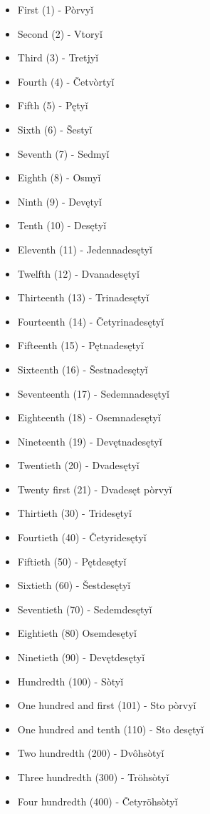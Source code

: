 \begin{itemize}
	\item First (1) - Pòrvyǐ
	\item Second (2) - Vtoryǐ
	\item Third (3) - Tretjyǐ
	\item Fourth (4) - Četvòrtyǐ
	\item Fifth (5) - Pętyǐ
	\item Sixth (6) - Šestyǐ
	\item Seventh (7) - Sedmyǐ
	\item Eighth (8) - Osmyǐ
	\item Ninth (9) - Devętyǐ
	\item Tenth (10) - Desętyǐ
	\item Eleventh (11) - Jedennadesętyǐ
	\item Twelfth (12) - Dvanadesętyǐ
	\item Thirteenth (13) - Trinadesętyǐ
	\item Fourteenth (14) - Četyrinadesętyǐ
	\item Fifteenth (15) - Pętnadesętyǐ
	\item Sixteenth (16) - Šestnadesętyǐ
	\item Seventeenth (17) - Sedemnadesętyǐ
	\item Eighteenth (18) - Osemnadesętyǐ
	\item Nineteenth (19) - Devętnadesętyǐ
	\item Twentieth (20) - Dvadesętyǐ
	\item Twenty first (21) - Dvadesęt pòrvyǐ
	\item Thirtieth (30) - Tridesętyǐ
	\item Fourtieth (40) - Četyridesętyǐ
	\item Fiftieth (50) - Pętdesętyǐ
	\item Sixtieth (60) - Šestdesętyǐ
	\item Seventieth (70) - Sedemdesętyǐ
	\item Eightieth (80) Osemdesętyǐ
	\item Ninetieth (90) - Devętdesętyǐ
	\item Hundredth (100) - Sòtyǐ
	\item One hundred and first (101) - Sto pòrvyǐ
	\item One hundred and tenth (110) - Sto desętyǐ
	\item Two hundredth (200) - Dvôhsòtyǐ
	\item Three hundredth (300) - Tröhsòtyǐ
	\item Four hundredth (400) - Četyröhsòtyǐ

\end{itemize}
